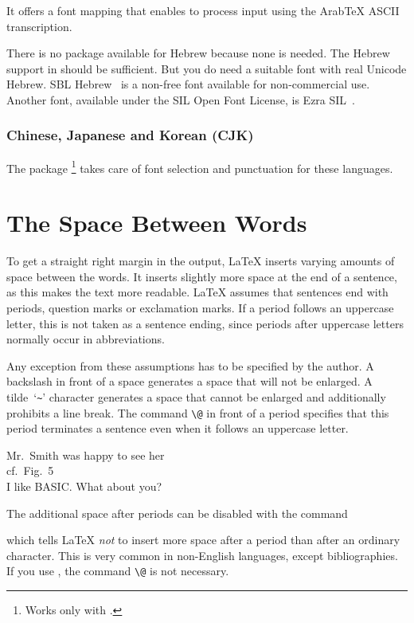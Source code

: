 It offers a font mapping that enables  to process input
using the Arab\TeX{} ASCII transcription.

There is no package available for Hebrew because none is needed.
The Hebrew support in  should be sufficient. But you do need a
suitable font with real Unicode Hebrew. SBL Hebrew~\cite{font:sblhebrew} is a
non-free font available for non-commercial use. Another font, available under
the SIL Open Font License, is Ezra SIL~\cite{font:ezrasil}.

\subsubsection{Chinese, Japanese and Korean (CJK)}

The package \footnote{Works only with
.} takes care of font selection and
punctuation for these languages.

\section{The Space Between Words}

To get a straight right margin in the output, \LaTeX{} inserts varying
amounts of space between the words. It inserts slightly more space at
the end of a sentence, as this makes the text more readable.  \LaTeX{}
assumes that sentences end with periods, question marks or exclamation
marks. If a period follows an uppercase letter, this is not taken as a
sentence ending, since periods after uppercase letters normally occur in
abbreviations.

Any exception from these assumptions has to be specified by the
author. A backslash in front of a space generates a space that will
not be enlarged. A tilde~`\verb|~|' character generates a space that cannot be
enlarged and additionally prohibits a line break. The command
\verb|\@| in front of a period specifies that this period terminates a
sentence even when it follows an uppercase letter.
  

\begin{example}
Mr.~Smith was happy to see her\\
cf.~Fig.~5\\
I like BASIC\@. What about you?
\end{example}

The additional space after periods can be disabled with the command
\begin{lscommand}
\end{lscommand}
\noindent which tells \LaTeX{} \emph{not} to insert more space after a
period than after an ordinary character. This is very common in
non-English languages, except bibliographies. If you use
, the command \verb|\@| is not necessary.

